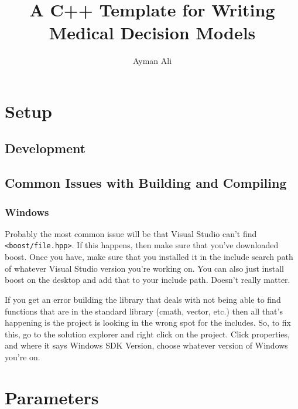 \documentclass{article}
\begin{document}
\title{%
    A C++ Template for Writing Medical Decision Models \\
}
\author{Ayman Ali}
\date{}
\maketitle

\clearpage

\tableofcontents
\listoffigures
\listoftables

\clearpage

\section{Setup}
\subsection{Development}
\subsection{Common Issues with Building and Compiling}
\subsubsection{Windows}
Probably the most common issue will be that Visual Studio can't find \verb|<boost/file.hpp>|. If this happens, then make sure that you've downloaded boost. Once you have, make sure that you installed it in the include search path of whatever Visual Studio version you're working on. You can also just install boost on the desktop and add that to your include path. Doesn't really matter.

If you get an error building the library that deals with not being able to find functions that are in the standard library (cmath, vector, etc.) then all that's happening is the project is looking in the wrong spot for the includes. So, to fix this, go to the solution explorer and right click on the project. Click properties, and where it says Windows SDK Version, choose whatever version of Windows you're on.

\section{Parameters}
\end{document}
